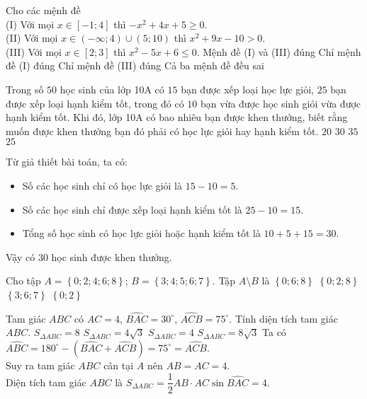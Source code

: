 \begin{ex}%
Cho các mệnh đề\\
(I) Với mọi $x \in [-1;4]$ thì $-x^2+4x+5 \geq 0$.\\
(II) Với mọi $x \in (-\infty;4) \cup (5;10)$ thì $x^2+9x-10>0$. \\
(III) Với mọi $x \in [2;3]$ thì $x^2-5x+6 \leq 0$.
\choice
{\True Mệnh đề (I) và (III) đúng}
{Chỉ mệnh đề (I) đúng}
{Chỉ mệnh đề (III) đúng}
{Cả ba mệnh đề đều sai}
\end{ex}

\begin{ex}%
Trong số $50$ học sinh của lớp 10A có $15$ bạn được xếp loại học lực giỏi, $25$ bạn được xếp loại hạnh kiểm tốt, trong đó có $10$ bạn vừa được học sinh giỏi vừa được hạnh kiểm tốt. Khi đó, lớp 10A có bao nhiêu bạn được khen thưởng, biết rằng muốn được khen thưởng bạn đó phải có học lực giỏi hay hạnh kiểm tốt.
\choice
{$20$}
{\True $30$}
{$35$}
{$25$}
\loigiai
{
Từ giả thiết bài toán, ta có:
\begin{itemize}
\item Số các học sinh chỉ có học lực giỏi là $15-10=5$.
\item Số các học sinh chỉ được xếp loại hạnh kiểm tốt là $25-10=15$.
\item Tổng số học sinh có học lực giỏi hoặc hạnh kiểm tốt là $10+5+15=30$.
\end{itemize}
Vậy có $30$ học sinh được khen thưởng.
}
\end{ex}

\begin{ex}%
Cho tập $ A=\left\{0;2;4;6;8\right\}$; $ B=\left\{3;4;5;6;7\right\}$. Tập $ A\setminus B$ là
\choice
{$\left\{0;6;8\right\}$}
{\True $\left\{0;2;8\right\}$}
{$\left\{3;6;7\right\}$}
{$\left\{0;2\right\}$}
\end{ex}

\begin{ex}%
Tam giác $ ABC$ có $ AC=4$, $\widehat{BAC}=30^\circ$, $\widehat{ACB}=75^\circ $. Tính diện tích tam giác $ ABC$.
\choice
{$ S_{\Delta ABC}=8$}
{$ S_{\Delta ABC}=4\sqrt{3}$}
{\True $ S_{\Delta ABC}=4$}
{$ S_{\Delta ABC}=8\sqrt{3}$}
\loigiai
{Ta có $ \widehat{ABC}=180^\circ-(\widehat{BAC}+\widehat{ACB} )=75^\circ =\widehat{ACB}$.\\
Suy ra tam giác $ ABC$ cân tại $ A$ nên $ AB=AC=4$.\\
Diện tích tam giác $ ABC$ là $ S_{\Delta ABC}=\dfrac{1}{2}AB\cdot AC\sin \widehat{BAC}=4$.}
\end{ex}

